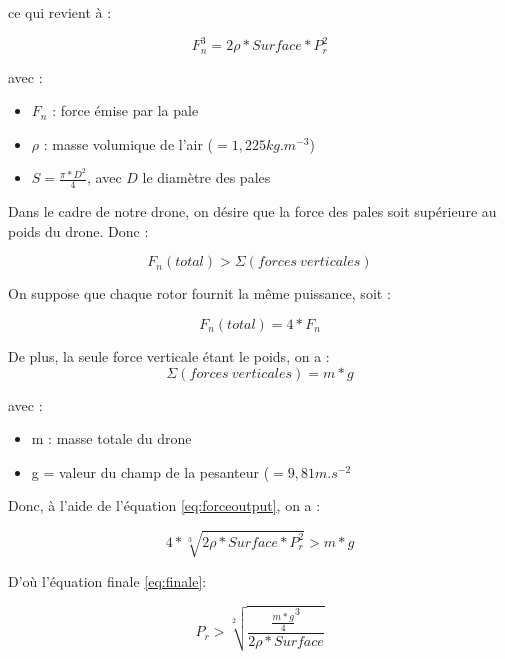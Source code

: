 \documentclass[a4paper,10pt]{report}
\begin{document}
	ce qui revient à :
	
	\begin{equation}
	  \label{eq:forceoutput}
	  F_{n}^{3} = 2 \rho * Surface * P_{r}^{2}
	\end{equation}
	
	avec :
	
	\begin{itemize}
	  \item $F_{n}$ : force émise par la pale
	  \item $\rho$ : masse volumique de l'air ($= 1,225kg.m^{-3}$)
	  \item $S = \frac{\pi * {D}^{2}}{4}$, avec $D$ le diamètre des pales
	\end{itemize}
	
	Dans le cadre de notre drone, on désire que la force des pales soit 
supérieure au poids du drone. Donc :

	\begin{equation}
	  F_{n}(total) > \Sigma (forces \ verticales) 
	\end{equation}
	
	On suppose que chaque rotor fournit la même puissance, soit :
	
	\begin{equation}
	  F_{n}(total) = 4 * F_{n} 
	\end{equation}

	De plus, la seule force verticale étant le poids, on a : 
	\begin{equation}
	  \Sigma (forces \ verticales) = m * g
	\end{equation}
	
	avec :
	
	\begin{itemize}
	  \item  m : masse totale du drone
	  \item  g = valeur du champ de la pesanteur ($=9,81m.s^{-2}$
	\end{itemize}

	Donc, à l'aide de l'équation \ref{eq:forceoutput}, on a : 
	
	\begin{equation}
	  4 * \sqrt[3]{2 \rho * Surface * P_{r}^{2}} > m*g
	\end{equation}
	
	D'où l'équation finale \ref{eq:finale}:
	
	\begin{equation}
	  \label{eq:finale}
	  P_{r}  > \sqrt[2]{\frac{\frac{m*g}{4}^{3}}{2 \rho * Surface}}
	\end{equation}
	
\end{document}
